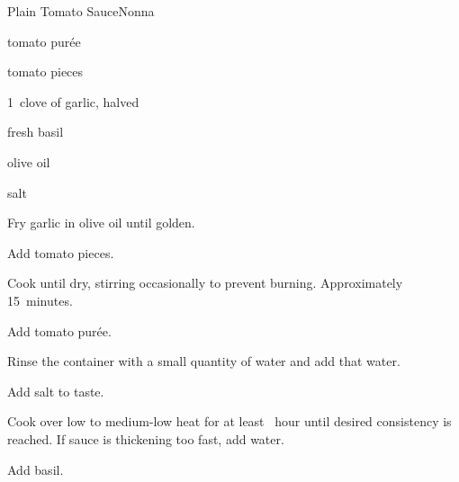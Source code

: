 \begin{recipe}{Plain Tomato Sauce}{Nonna}{}

\begin{ingredients}
\item {} tomato pur\'ee
\item \ltr{\half} tomato pieces
\item 1~clove of garlic, halved
\item fresh basil
\item olive oil
\item salt
\end{ingredients}

\begin{directions}
\item Fry garlic in olive oil until golden.
\item Add tomato pieces.
\item Cook until dry, stirring occasionally to prevent burning. Approximately 15~minutes.
\item Add tomato pur\'ee.
\item Rinse the container with a small quantity of water and add that water.
\item Add salt to taste.
\item Cook over low to medium-low heat for at least \half~hour until desired consistency is reached. If sauce is thickening too fast, add water.
\item Add basil.
\end{directions}

\end{recipe}
